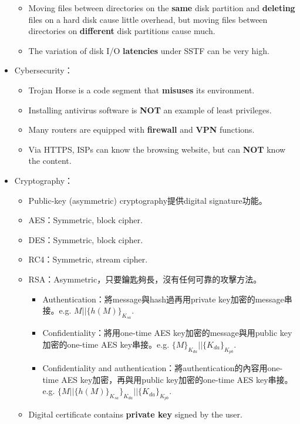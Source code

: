 \begin{itemize}
\begin{itemize}
        \item Moving files between directories on the \textbf{same} disk partition and \textbf{deleting} files on a hard disk cause little overhead, but moving files between directories on \textbf{different} disk partitions cause much.
        \item The variation of disk I/O \textbf{latencies} under SSTF can be very high.
    \end{itemize}
    \item Cybersecurity： \begin{itemize}
        \item Trojan Horse is a code segment that \textbf{misuses} its environment.
        \item Installing antivirus software is \textbf{NOT} an example of least privileges.
        \item Many routers are equipped with \textbf{firewall} and \textbf{VPN} functions.
        \item Via HTTPS, ISPs can know the browsing website, but can \textbf{NOT} know the content.
    \end{itemize}
    \item Cryptography： \begin{itemize}
        \item Public-key (asymmetric) cryptography提供digital signature功能。
        \item AES：Symmetric, block cipher.
        \item DES：Symmetric, block cipher.
        \item RC4：Symmetric, stream cipher.
        \item RSA：Asymmetric，只要鑰匙夠長，沒有任何可靠的攻擊方法。\begin{itemize}
            \item Authentication：將message與hash過再用private key加密的message串接。e.g. $M || \{h(M)\}_{K_{sa}}$.
            \item Confidentiality：將用one-time AES key加密的message與用public key加密的one-time AES key串接。e.g. $\{M\}_{K_{da}} || \{K_{da}\}_{K_{pb}}$.
            \item Confidentiality and authentication：將authentication的內容用one-time AES key加密，再與用public key加密的one-time AES key串接。e.g. $\{M || \{h(M)\}_{K_{sa}}\}_{K_{da}} || \{K_{da}\}_{K_{pb}}$.
        \end{itemize}
        \item Digital certificate contains \textbf{private key} signed by the user.

\end{itemize}
\end{itemize}
